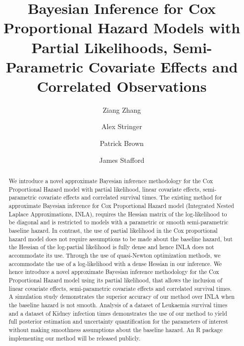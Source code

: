 \documentclass[serif,10pt]{wiley-article}
\title{Bayesian Inference for Cox Proportional Hazard Models with Partial Likelihoods, Semi-Parametric Covariate Effects and Correlated Observations}
\author[1]{Ziang Zhang}
\author[1,2]{Alex Stringer}
\author[1,2]{Patrick Brown}
\author[1]{James Stafford}
\affil[1]{Department of Statistical Sciences, University of Toronto, Ontario,Canada}
\affil[2]{Centre for Global Health Research, St. Michael's Hospital, Ontario,Canada}
\begin{document}
\begin{frontmatter}
\maketitle

\begin{abstract}
{\selectfont
We introduce a novel approximate Bayesian inference methodology for the Cox Proportional Hazard model with partial likelihood, linear covariate effects, semi-parametric covariate effects and correlated survival times. The existing method for approximate Bayesian inference for Cox Proportional Hazard model (Integrated Nested Laplace Approximations, INLA), requires the Hessian matrix of the log-likelihood to be diagonal and is restricted to models with a parametric or smooth semi-parametric baseline hazard. In contrast, the use of partial likelihood in the Cox proportional hazard model does not require assumptions to be made about the baseline hazard, but the Hessian of the log-partial likelihood is fully dense and hence INLA does not accommodate its use. Through the use of quasi-Newton optimization methods, we accommodate the use of a log-likelihood with a dense Hessian in our inference. We hence introduce a novel approximate Bayesian inference methodology for the Cox Proportional Hazard model using its partial likelihood, that allows the inclusion of linear covariate effects, semi-parametric covariate effects and correlated survival times. A simulation study demonstrates the superior accuracy of our method over INLA when the baseline hazard is not smooth. Analysis of a dataset of Leukaemia survival times and a dataset of Kidney infection times demonstrates the use of our method to yield full posterior estimation and uncertainty quantification for the parameters of interest without making smoothness assumptions about the baseline hazard. An R package implementing our method will be released publicly.
}

\end{abstract}
\end{frontmatter}
\end{document}
